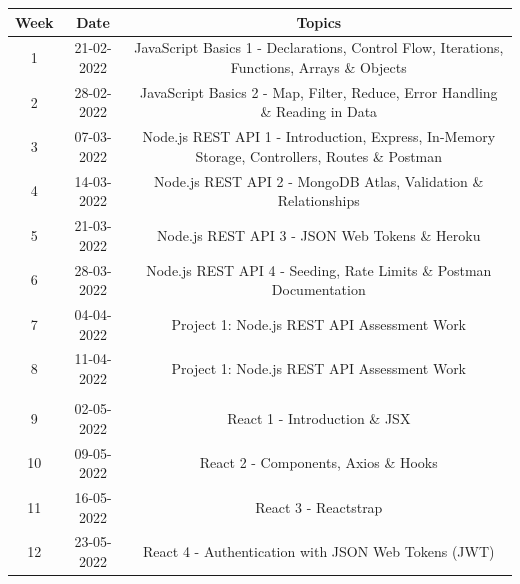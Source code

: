 \documentclass{article}
\begin{document}
\renewcommand{\arraystretch}{1.5}
\begin{tabular}{|c|c|c|c|}
	\hline
	\textbf{Week} & \textbf{Date}     & \multicolumn{2}{c|}{\textbf{Topics}}        \\ \hline
	\footnotesize 1      & \footnotesize 21-02-2022 & \multicolumn{2}{c|}{\footnotesize JavaScript Basics 1 - Declarations, Control Flow, Iterations, Functions, Arrays \& Objects} \\ \hline
	\footnotesize 2      & \footnotesize 28-02-2022 & \multicolumn{2}{c|}{\footnotesize JavaScript Basics 2 - Map, Filter, Reduce, Error Handling \& Reading in Data} \\ \hline
	\footnotesize 3      & \footnotesize 07-03-2022 & \multicolumn{2}{c|}{\footnotesize Node.js REST API 1 - Introduction, Express, In-Memory Storage, Controllers, Routes \& Postman} \\ \hline
	\footnotesize 4      & \footnotesize 14-03-2022 & \multicolumn{2}{c|}{\footnotesize Node.js REST API 2 - MongoDB Atlas, Validation \& Relationships} \\ \hline
	\footnotesize 5      & \footnotesize 21-03-2022 & \multicolumn{2}{c|}{\footnotesize Node.js REST API 3 - JSON Web Tokens \& Heroku } \\ \hline
	\footnotesize 6      & \footnotesize 28-03-2022 & \multicolumn{2}{c|}{\footnotesize Node.js REST API 4 -  Seeding, Rate Limits \& Postman Documentation} \\ \hline
	\footnotesize 7      & \footnotesize 04-04-2022 & \multicolumn{2}{c|}{\footnotesize Project 1: Node.js REST API Assessment Work} \\ \hline
	\footnotesize 8      & \footnotesize 11-04-2022 & \multicolumn{2}{c|}{\footnotesize Project 1: Node.js REST API Assessment Work} \\ \hline
	\rowcolor{yellow} \multicolumn{4}{|c|}{\footnotesize Mid Term Break}                    \\ \hline
	\footnotesize 9      & \footnotesize 02-05-2022 & \multicolumn{2}{c|}{\footnotesize React 1 - Introduction \& JSX} \\ \hline
	\footnotesize 10     & \footnotesize 09-05-2022 & \multicolumn{2}{c|}{\footnotesize React 2 - Components, Axios \& Hooks} \\ \hline
	\footnotesize 11     & \footnotesize 16-05-2022 & \multicolumn{2}{c|}{\footnotesize React 3 - Reactstrap}     \\ \hline
	\footnotesize 12     & \footnotesize 23-05-2022 & \multicolumn{2}{c|}{\footnotesize React 4 - Authentication with JSON Web Tokens (JWT)}    \\ \hline

\end{tabular}
\end{document}
